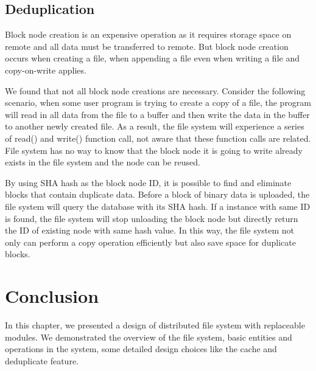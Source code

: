 \subsection{Deduplication}

    Block node creation is an expensive operation as it requires storage space on remote and all data must be transferred to remote. But block node creation occurs when creating a file, when appending a file even when writing a file and copy-on-write applies.
    
    We found that not all block node creations are necessary. Consider the following scenario, when some user program is trying to create a copy of a file, the program will read in all data from the file to a buffer and then write the data in the buffer to another newly created file. As a result, the file system will experience a series of read() and write() function call, not aware that these function calls are related. File system has no way to know that the block node it is going to write already exists in the file system and the node can be reused.

    By using SHA hash as the block node ID, it is possible to find and eliminate blocks that contain duplicate data. Before a block of binary data is uploaded, the file system will query the database with its SHA hash. If a instance with same ID is found, the file system will stop unloading the block node but directly return the ID of existing node with same hash value. In this way, the file system not only can perform a copy operation efficiently but also save space for duplicate blocks. 

\section{Conclusion}

    In this chapter, we presented a design of distributed file system with replaceable modules. We demonstrated the overview of the file system, basic entities and operations in the system, some detailed design choices like the cache and deduplicate feature.

